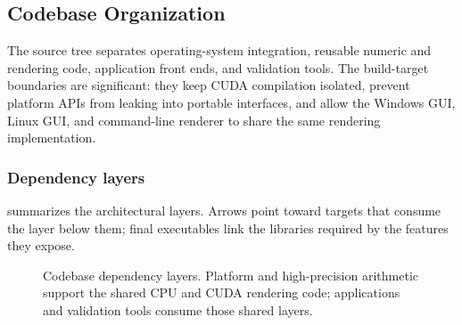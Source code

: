 \subsection{Codebase Organization}
\label{sec:code-organization}

The source tree separates operating-system integration, reusable numeric and
rendering code, application front ends, and validation tools.  The build-target
boundaries are significant: they keep CUDA compilation isolated, prevent
platform APIs from leaking into portable interfaces, and allow the Windows GUI,
Linux GUI, and command-line renderer to share the same rendering implementation.

\subsubsection{Dependency layers}

 summarizes the architectural layers.  Arrows point
toward targets that consume the layer below them; final executables link the
libraries required by the features they expose.

\begin{figure}[!htbp]
  \centering
  \caption[Codebase dependency layers]{Codebase dependency layers.  Platform and
    high-precision arithmetic support the shared CPU and CUDA rendering code;
    applications and validation tools consume those shared layers.}
  \label{fig:codebase-layers}
\end{figure}

